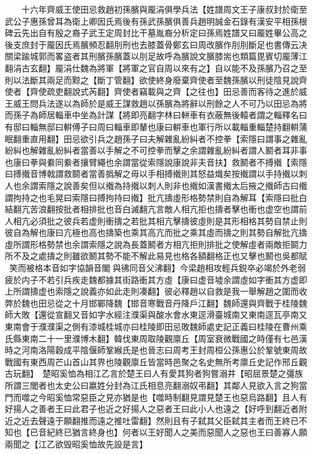 　　十六年齊威王使田忌救趙初孫臏與龎涓俱學兵法【姓譜周文王子康叔封於衛至武公子惠孫曾耳為衛上卿因氏焉後有孫武孫臏俱善兵趙明誠金石錄有漢安平相孫根碑云先出自有殷之裔子武王定周封比干墓胤裔分析定曰孫焉姓譜又曰龎姓畢公高之後支庶封于龎因氏焉臏頻忍翻刖刑也去膝蓋骨鄭玄曰周改臏作刖刖斷足也書傳云决關梁踰城郭而畧盗者其刑臏孫臏蓋以刖足故呼為臏說文臏膝耑也類篇毘賓切龎薄江翻涓古玄翻】龎涓仕魏為將軍【將軍之官自周以來有之】自以能不及孫臏乃召之至則以法斷其兩足而黥之【斷丁管翻】欲使終身廢棄齊使者至魏孫臏以刑徒陰見說齊使者【齊使疏吏翻說式芮翻】齊使者竊載與之齊【之往也】田忌善而客待之進於威王威王問兵法遂以為師於是威王謀救趙以孫臏為將辭以刑餘之人不可乃以田忌為將而孫子為師居輜車中坐為計謀【將即亮翻字林曰軿車有衣蔽無後轅者謂之輜釋名曰有邸曰輜無邸曰輧傅子曰周曰輜車即輦也康曰輧車也軍行所以載輜重輜楚持翻輧蒲眠翻重直用翻】田忌欲引兵之趙孫子曰夫解雜亂紛糾者不控拳【索隱曰謂事之雜亂紛糾也解雜亂紛糾者當善以手解之不可控拳而擊之余謂雜亂紛糾者謂人鬭者耳非事也康曰拳與絭同絭者攘臂繩也余謂當從索隱說康說非夫音扶】救鬭者不搏撠【索隱曰搏撠音博戟謂救鬬者當善撝解之毋以手相搏撠則其怒益熾矣按撠謂以手持撠以刺人也余謂索隱之說善矣但以撠為持撠以刺人則非也撠如漢書撠太后掖之撠師古曰撠謂拘持之也毛晃曰索隱曰搏拘持曰撠】批亢擣虛形格勢禁則自為解耳【索隱曰批白結翻亢苦浪翻按批者相排批也音白滅翻亢言敵人相亢拒也擣者擊也衝也虚空也謂前人相亢必須批之彼兵若虚則衝擣之若批其相亢擊擣彼虛則是其形相格其勢自禁止則彼自為解也康曰亢極也高也擣築也乘其高亢而批之乘其虛而擣之則其勢自解批亢擣虛所謂形格勢禁也余謂索隱之說為長蓋鬭者方相亢拒則排批之使解虛者兩敵拒鬬力所不及之處擣之則雖欲鬭其勢不能不解此易見也格各額翻格正也又擊也鬭也吳都賦笑而被格本音如字協韻音閣與彿同音父沸翻】今梁趙相攻輕兵鋭卒必竭於外老弱疲於内子不若引兵疾走魏都據其街路衝其方虛【康曰虚音墟余謂虛如字衝其方虚即上所謂擣虚也索隱之說義亦如此走則凑翻】彼必釋趙以自救是我一舉解趙之圍而收弊於魏也田忌從之十月邯鄲降魏【邯音寒戰音丹降戶江翻】魏師還與齊戰于桂陵魏師大敗【還從宣翻又音如字水經注濮渠與酸水會水東逕滑臺城南又東南逕瓦亭南又東南會于濮濮渠之側有漆城桂城亦曰桂陵即田忌敗魏師處史記正義曰桂陵在曹州乘氏縣東南二十一里濮博木翻】韓伐東周取陵觀廪丘【周室衰微戰國之時僅有七邑漢時之河南洛陽穀成平陰偃師鞏緱氏是也晉志曰周考王封周桓公孫惠公於鞏號東周故戰國有東西周芒山首山其界也陵觀廪丘皆當時邑聚之名史無所考廪丘史記作邢丘觀古玩翻】　楚昭奚恤為相江乙言於楚王曰人有愛其狗者狗嘗溺井【昭屈景楚之彊族所謂三閭者也太史公曰嬴姓分封為江氏相息亮翻溺奴弔翻】其鄰人見欲入言之狗當門而噬之今昭奚恤常惡臣之見亦猶是也【噬時制翻見謂見楚王也惡烏路翻】且人有好揚人之善者王曰此君子也近之好揚人之惡者王曰此小人也遠之【好呼到翻近者附近之近去聲遠于願翻推而遠之推吐雷翻】然則且有子弑其父臣弑其主者而王終已不知也【已音紀終已猶言終身也】何者以王好聞人之美而惡聞人之惡也王曰善寡人願兩聞之【江乙欲毁昭奚恤故先設是言】

